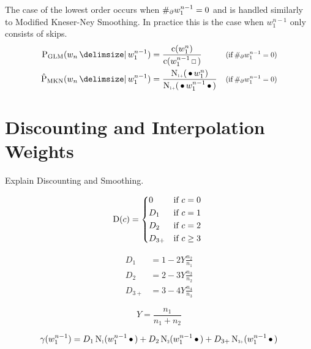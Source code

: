 The case of the lowest order occurs when $\NumSkpOp{w_1^{n-1}} = 0$ and is
handled similarly to Modified Kneser-Ney Smoothing.
In practice this is the case when $w_1^{n-1}$ only consists of skips.
\begin{subequations}
  \label{eq:glm-lowest}
  \begin{align}
    \ProbGLM {w_n}{w_1^{n-1}} &= \frac{\Count(w_1^n)}{\Count(w_1^{n-1} \Skp)}
      & \Condition{\NumSkpOp{w_1^{n-1}} = 0} \\
    \ProbMKN*{w_n}{w_1^{n-1}} &= \frac{\ContCountIp(\WSkp w_1^n)}{\ContCountIp(\WSkp w_1^{n-1} \WSkp)}
      & \Condition{\NumSkpOp{w_1^{n-1}} = 0}
  \end{align}
\end{subequations}

\section{Discounting and Interpolation Weights}
\label{sec:discounts-interpolation-weights}

\begin{draft}
Explain Discounting and Smoothing.
\end{draft}

\begin{draft}
\begin{equation}
  \Discount(c) =
    \begin{dcases*}
      0      & if $c = 0$ \\
      D_1    & if $c = 1$ \\
      D_2    & if $c = 2$ \\
      D_{3+} & if $c \geq 3$
    \end{dcases*}
\end{equation}

\begin{subequations}
  \begin{align}
    D_1    &= 1 - 2 Y \frac{n_2}{n_1} \\
    D_2    &= 2 - 3 Y \frac{n_3}{n_2} \\
    D_{3+} &= 3 - 4 Y \frac{n_4}{n_3}
  \end{align}
\end{subequations}

\begin{equation}
  Y = \frac{n_1}{n_1 + n_2}
\end{equation}

\begin{equation}
  \gamma(w_1^{n-1}) =   D_1    \ContCountI    (w_1^{n-1} \WSkp)
                      + D_2    \ContCountII   (w_1^{n-1} \WSkp)
                      + D_{3+} \ContCountIIIp (w_1^{n-1} \WSkp)
\end{equation}
\end{draft}
